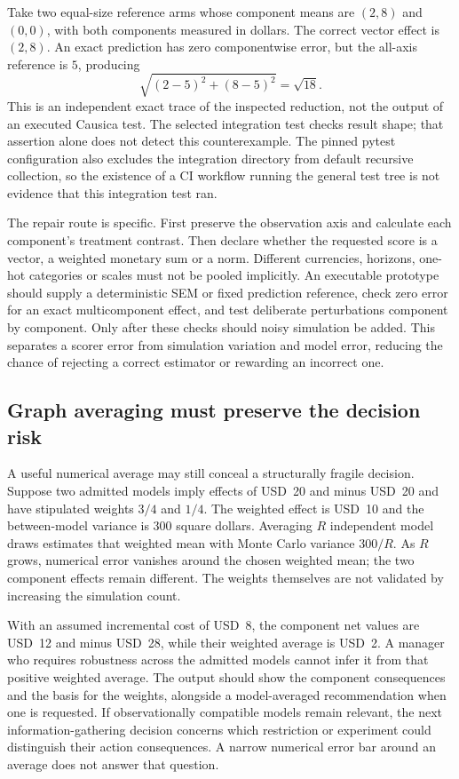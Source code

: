 Take two equal-size reference arms whose component means are \((2,8)\) and
\((0,0)\), with both components measured in dollars. The correct vector
effect is \((2,8)\). An exact prediction has zero componentwise error, but
the all-axis reference is \(5\), producing
\[
       \sqrt{(2-5)^2+(8-5)^2}=\sqrt{18}.
\]
This is an independent exact trace of the inspected reduction, not the output
of an executed Causica test. The selected integration test checks result shape;
that assertion alone does not detect this counterexample. The pinned pytest
configuration also excludes the integration directory from default recursive
collection, so the existence of a CI workflow running the general test tree
is not evidence that this integration test ran.
\citep{exec14_causica_primary,exec14_causica_exact}

The repair route is specific. First preserve the observation axis and calculate
each component's treatment contrast. Then declare whether the requested score
is a vector, a weighted monetary sum or a norm. Different currencies, horizons,
one-hot categories or scales must not be pooled implicitly. An executable
prototype should supply a deterministic SEM or fixed prediction reference,
check zero error for an exact multicomponent effect, and test deliberate
perturbations component by component. Only after these checks should noisy
simulation be added. This separates a scorer error from simulation variation
and model error, reducing the chance of rejecting a correct estimator or
rewarding an incorrect one. \citep{exec14_causica_decision}

\subsection{Graph averaging must preserve the decision risk}

A useful numerical average may still conceal a structurally fragile decision.
Suppose two admitted models imply effects of USD~20 and minus USD~20 and have
stipulated weights \(3/4\) and \(1/4\). The weighted effect is USD~10 and the
between-model variance is \(300\) square dollars. Averaging \(R\) independent
model draws estimates that weighted mean with Monte Carlo variance \(300/R\).
As \(R\) grows, numerical error vanishes around the chosen weighted mean;
the two component effects remain different. The weights themselves are not
validated by increasing the simulation count. \citep{exec14_causica_exact}

With an assumed incremental cost of USD~8, the component net values are
USD~12 and minus USD~28, while their weighted average is USD~2. A manager who
requires robustness across the admitted models cannot infer it from that
positive weighted average. The output should show the component consequences
and the basis for the weights, alongside a model-averaged recommendation
when one is requested. If observationally compatible models remain relevant,
the next information-gathering decision concerns which restriction or
experiment could distinguish their action consequences. A narrow numerical
error bar around an average does not answer that question.
\citep{exec14_causica_exact,exec14_causica_decision}

